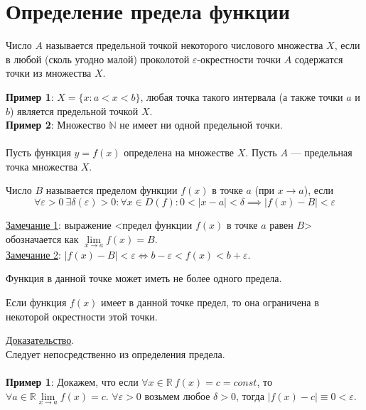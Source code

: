 \documentclass{article}
\begin{document}
    \section{Определение предела функции}
    \begin{definition}
        Число \(A\) называется предельной точкой некоторого числового множества \(X\), если в любой (сколь угодно малой) проколотой \(\varepsilon\)-окрестности точки \(A\) содержатся точки из множества \(X\).  
    \end{definition}   
    \noindent
    \textbf{Пример 1}: \(X = \{x : a < x < b\}\), любая точка такого интервала (а также точки \(a\) и \(b\)) является предельной точкой \(X\).\\
    \textbf{Пример 2}: Множество \(\mathbb{N}\) не имеет ни одной предельной точки.\\ \\
    Пусть функция \(y = f(x)\) определена на множестве \(X\). Пусть \(A\) --- предельная точка множества \(X\).   
    \begin{definition}
        Число \(B\) называется пределом функции \(f(x)\) в точке \(a\) (при \(x \to a\)), если \[\forall \varepsilon > 0\ \exists \delta(\varepsilon) > 0: \forall x \in D(f): 0 < |x - a| < \delta \implies |f(x) - B| < \varepsilon\] 
    \end{definition}
    \noindent
    \underline{Замечание 1}: выражение <предел функции \(f(x)\) в точке \(a\) равен \(B\)> обозначается как \(\lim\limits_{x \to a}f(x) = B\).\\
    \underline{Замечание 2}: \(|f(x) - B| < \varepsilon \iff b - \varepsilon < f(x) < b + \varepsilon\).\\
    \begin{claim} 
        Функция в данной точке может иметь не более одного предела.
    \end{claim}
    \begin{claim} 
        Если функция \(f(x)\) имеет в данной точке предел, то она ограничена в некоторой окрестности этой точки.
    \end{claim}
    \noindent
    \underline{Доказательство}.\\
    Следует непосредственно из определения предела.\\ \\
    \textbf{Пример 1}: 
    Докажем, что если \(\forall x \in \mathbb{R}\ f(x) = c = const\), то \(\forall a \in \mathbb{R} \lim\limits_{x \to a}f(x) = c\).
    \(\forall \varepsilon > 0\) возьмем любое \(\delta > 0\), тогда \(|f(x) - c| \equiv 0 < \varepsilon\).\\ 
\end{document}
